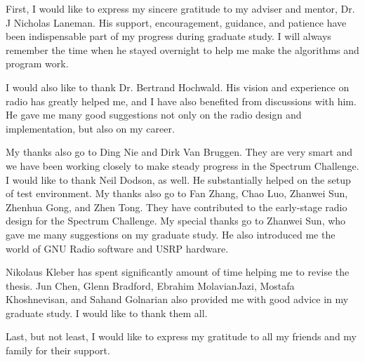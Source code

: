 \documentclass[final,numrefs,sort&compress,oneadvisor,noinfo]{nddiss2e}
\begin{document}
\begin{acknowledge}
First, I would like to express my sincere gratitude to my adviser and mentor, Dr. J Nicholas Laneman. His support, encouragement, guidance, and patience have been indispensable part of my progress during graduate study. I will always remember the time when he stayed overnight to help me make the algorithms and program work.

I would also like to thank Dr. Bertrand Hochwald. His vision and experience on radio has greatly helped me, and I have also benefited from discussions with him. He gave me many good suggestions not only on the radio design and implementation, but also on my career.

My thanks also go to Ding Nie and Dirk Van Bruggen. They are very smart and we have been working closely to make steady progress in the Spectrum Challenge. I would like to thank Neil Dodson, as well. He substantially helped on the setup of test environment. My thanks also go to Fan Zhang, Chao Luo, Zhanwei Sun, Zhenhua Gong, and Zhen Tong. They have contributed to the early-stage radio design for the Spectrum Challenge. My special thanks go to Zhanwei Sun, who gave me many suggestions on my graduate study. He also introduced me the world of GNU Radio software and USRP hardware.

Nikolaus Kleber has spent significantly amount of time helping me to revise the thesis. Jun Chen, Glenn Bradford, Ebrahim MolavianJazi, Mostafa Khoshnevisan, and Sahand Golnarian also provided me with good advice in my graduate study. I would like to thank them all.

Last, but not least, I would like to express my gratitude to all my friends and my family for their support.
\end{acknowledge}


\mainmatter
%
\end{document}
